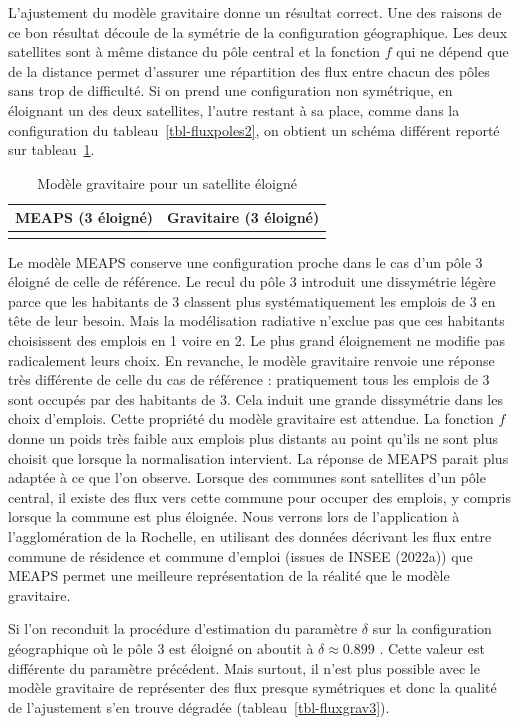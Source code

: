\documentclass[
  10pt,
  a4paper,
  numbers=noendperiod,
  DIV=9]{scrreprt}
\begin{document}
L'ajustement du modèle gravitaire donne un résultat correct. Une des
raisons de ce bon résultat découle de la symétrie de la configuration
géographique. Les deux satellites sont à même distance du pôle central
et la fonction \(f\) qui ne dépend que de la distance permet d'assurer
une répartition des flux entre chacun des pôles sans trop de difficulté.
Si on prend une configuration non symétrique, en éloignant un des deux
satellites, l'autre restant à sa place, comme dans la configuration du
tableau~\ref{tbl-fluxpoles2}, on obtient un schéma différent reporté sur
tableau~\ref{tbl-fluxgrav2}.

\hypertarget{tbl-fluxgrav2}{}
\begin{longtable}{cc}
\caption{\label{tbl-fluxgrav2}Modèle gravitaire pour un satellite éloigné }\tabularnewline

\toprule
MEAPS (3 éloigné) & Gravitaire (3 éloigné) \\ 
\midrule
 &  \\ 
\bottomrule
\end{longtable}

Le modèle MEAPS conserve une configuration proche dans le cas d'un pôle
3 éloigné de celle de référence. Le recul du pôle 3 introduit une
dissymétrie légère parce que les habitants de 3 classent plus
systématiquement les emplois de 3 en tête de leur besoin. Mais la
modélisation radiative n'exclue pas que ces habitants choisissent des
emplois en 1 voire en 2. Le plus grand éloignement ne modifie pas
radicalement leurs choix. En revanche, le modèle gravitaire renvoie une
réponse très différente de celle du cas de référence : pratiquement tous
les emplois de 3 sont occupés par des habitants de 3. Cela induit une
grande dissymétrie dans les choix d'emplois. Cette propriété du modèle
gravitaire est attendue. La fonction \(f\) donne un poids très faible
aux emplois plus distants au point qu'ils ne sont plus choisit que
lorsque la normalisation intervient. La réponse de MEAPS parait plus
adaptée à ce que l'on observe. Lorsque des communes sont satellites d'un
pôle central, il existe des flux vers cette commune pour occuper des
emplois, y compris lorsque la commune est plus éloignée. Nous verrons
lors de l'application à l'agglomération de la Rochelle, en utilisant des
données décrivant les flux entre commune de résidence et commune
d'emploi (issues de INSEE (2022a)) que MEAPS permet une meilleure
représentation de la réalité que le modèle gravitaire.

Si l'on reconduit la procédure d'estimation du paramètre \(\delta\) sur
la configuration géographique où le pôle 3 est éloigné on aboutit à
\(\delta \approx 0.899\) . Cette valeur est différente du paramètre
précédent. Mais surtout, il n'est plus possible avec le modèle
gravitaire de représenter des flux presque symétriques et donc la
qualité de l'ajustement s'en trouve dégradée
(tableau~\ref{tbl-fluxgrav3}).
\end{document}
